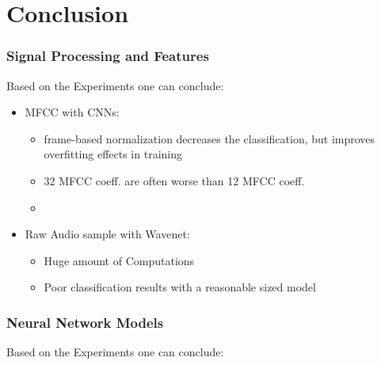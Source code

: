 
\section{Conclusion}
\begin{frame}
  \frametitle{Signal Processing and Features}
  Based on the Experiments one can conclude:
  \begin{itemize}
    \item MFCC with CNNs:
    \begin{itemize}
      \item frame-based normalization decreases the classification, but improves overfitting effects in training
      \item 32 MFCC coeff. are often worse than 12 MFCC coeff.
      \item  
    \end{itemize}
    \item Raw Audio sample with Wavenet:
    \begin{itemize}
      \item Huge amount of Computations
      \item Poor classification results with a reasonable sized model
    \end{itemize}
  \end{itemize}
\end{frame}


\begin{frame}
  \frametitle{Neural Network Models}
  Based on the Experiments one can conclude:
\end{frame}